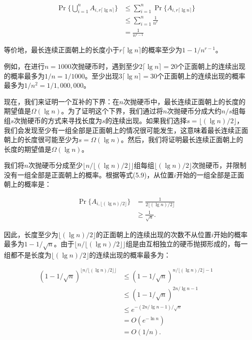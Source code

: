 \documentclass[lang=cn,newtx,10pt,scheme=chinese]{elegantbook}
\begin{document}
$$
\begin{aligned}
\operatorname{Pr}\{\bigcup_{i=1}^n A_{i, r\lceil\lg n\rceil}\} & \leq \sum_{i=1}^n \operatorname{Pr}\{A_{i, r\lceil\lg n\rceil}\} \\
& \leq \sum_{i=1}^n \frac{1}{n^r} \\
& =\frac{1}{n^{r-1}}
\end{aligned}
$$

等价地，最长连续正面朝上的长度小于$r\lceil\lg n\rceil$的概率至少为$1-1/n^{r-1}$。

例如，在进行$n=1000$次抛硬币时，遇到至少$2\lceil\lg n\rceil=20$个正面朝上的连续出现的概率最多为$1/n=1/1000$。至少出现$3\lceil\lg n\rceil=30$个正面朝上的连续出现的概率最多为$1/n^2=1/1,000,000$。

现在，我们来证明一个互补的下界：在$n$次抛硬币中，最长连续正面朝上的长度的期望值是$\Omega(\lg n)$。为了证明这个下界，我们通过将$n$次抛硬币分成大约$n/s$组每组$s$次抛硬币的方式来寻找长度为$s$的连续出现。如果我们选择$s=\lfloor(\lg n) / 2\rfloor$，我们会发现至少有一组全部是正面朝上的情况很可能发生，这意味着最长连续正面朝上的长度很可能至少为$s=\Omega(\lg n)$。然后，我们将证明最长连续正面朝上的长度的期望值是$\Omega(\lg n)$。

我们将$n$次抛硬币分成至少$\lfloor n /\lfloor(\lg n) / 2\rfloor\rfloor$组每组$\lfloor(\lg n) / 2\rfloor$次抛硬币，并限制没有一组全部是正面朝上的概率。根据等式(5.9)，从位置$i$开始的一组全部是正面朝上的概率是：

$$
\begin{aligned}
\operatorname{Pr}\{A_{i,\lfloor(\lg n) / 2\rfloor}\} & =\frac{1}{2\lfloor(\lg n) / 2\rfloor} \\
& \geq \frac{1}{\sqrt{n}} .
\end{aligned}
$$

因此，长度至少为$\lfloor(\lg n) / 2\rfloor$的正面朝上的连续出现的次数不从位置$i$开始的概率最多为$1-1/\sqrt{n}$。由于$\lfloor n /\lfloor(\lg n) / 2\rfloor\rfloor$组是由互相独立的硬币抛掷形成的，每一组都不是长度为$\lfloor(\lg n) / 2\rfloor$的连续出现的概率最多为：

$$
\begin{aligned}
(1-1 / \sqrt{n})^{\lfloor n /\lfloor(\lg n) / 2\rfloor\rfloor} & \leq(1-1 / \sqrt{n})^{n /\lfloor(\lg n) / 2\rfloor-1} \\
& \leq(1-1 / \sqrt{n})^{2 n / \lg n-1} \\
& \leq e^{-(2 n / \lg n-1) / \sqrt{n}} \\
& =O(e^{-\ln n}) \\
& =O(1 / n) .
\end{aligned}
$$
\end{document}
